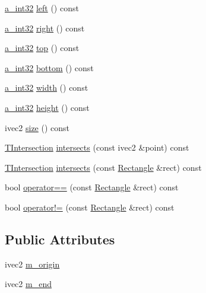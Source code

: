 \begin{DoxyCompactItemize}
\item 
\hyperlink{_common_defines_8h_ae2e4316e0b924774484a728669bebc9b}{a\+\_\+int32} \hyperlink{class_agmd_maths_1_1_rectangle_a5f7011fcba6e867de2b407e8818b7283}{left} () const 
\item 
\hyperlink{_common_defines_8h_ae2e4316e0b924774484a728669bebc9b}{a\+\_\+int32} \hyperlink{class_agmd_maths_1_1_rectangle_a3d13be4ed7660488576b66eace8910fe}{right} () const 
\item 
\hyperlink{_common_defines_8h_ae2e4316e0b924774484a728669bebc9b}{a\+\_\+int32} \hyperlink{class_agmd_maths_1_1_rectangle_a58a5c48cad84de8f8c1babd77f2b1500}{top} () const 
\item 
\hyperlink{_common_defines_8h_ae2e4316e0b924774484a728669bebc9b}{a\+\_\+int32} \hyperlink{class_agmd_maths_1_1_rectangle_ada206ea2716bacbbfe6a634b304ae636}{bottom} () const 
\item 
\hyperlink{_common_defines_8h_ae2e4316e0b924774484a728669bebc9b}{a\+\_\+int32} \hyperlink{class_agmd_maths_1_1_rectangle_af1c815824174137249e8e73d2619a220}{width} () const 
\item 
\hyperlink{_common_defines_8h_ae2e4316e0b924774484a728669bebc9b}{a\+\_\+int32} \hyperlink{class_agmd_maths_1_1_rectangle_a9dae0715e9e44bdbd86bc1d952862cd6}{height} () const 
\item 
ivec2 \hyperlink{class_agmd_maths_1_1_rectangle_a370280fcbf5e0e41b19c81070d29b673}{size} () const 
\item 
\hyperlink{_agmd_maths_2_rectangle_8h_aeee55021337f0391ea521ead70eafbe6}{T\+Intersection} \hyperlink{class_agmd_maths_1_1_rectangle_ae80c388222e8fd91f1d9f0d7415897a3}{intersects} (const ivec2 \&point) const 
\item 
\hyperlink{_agmd_maths_2_rectangle_8h_aeee55021337f0391ea521ead70eafbe6}{T\+Intersection} \hyperlink{class_agmd_maths_1_1_rectangle_a67c67fae05974c1b6b67ad660300d5a8}{intersects} (const \hyperlink{class_agmd_maths_1_1_rectangle}{Rectangle} \&rect) const 
\item 
bool \hyperlink{class_agmd_maths_1_1_rectangle_a48bf03a407f0114898d020c5b4f9ea64}{operator==} (const \hyperlink{class_agmd_maths_1_1_rectangle}{Rectangle} \&rect) const 
\item 
bool \hyperlink{class_agmd_maths_1_1_rectangle_a6d95a2bb73f0edcd99fb5e9fe190c4cf}{operator!=} (const \hyperlink{class_agmd_maths_1_1_rectangle}{Rectangle} \&rect) const 
\end{DoxyCompactItemize}
\subsection*{Public Attributes}
\begin{DoxyCompactItemize}
\item 
ivec2 \hyperlink{class_agmd_maths_1_1_rectangle_a080e6e9953184ed15b67650a88547e08}{m\+\_\+origin}
\item 
ivec2 \hyperlink{class_agmd_maths_1_1_rectangle_a5cc9ed9b61fdcfe68c2eb6d4df9a25a3}{m\+\_\+end}
\end{DoxyCompactItemize}


